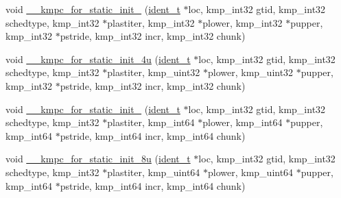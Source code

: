 \begin{DoxyCompactItemize}
\item 
void \hyperlink{group__WORK__SHARING_gab516cbd738ec072f4929faecbbc456f9}{\-\_\-\-\_\-kmpc\-\_\-for\-\_\-static\-\_\-init\-\_} (\hyperlink{group__BASIC__TYPES_ga690fda6b92f039a72db263c6b4394ddb}{ident\-\_\-t} $\ast$loc, kmp\-\_\-int32 gtid, kmp\-\_\-int32 schedtype, kmp\-\_\-int32 $\ast$plastiter, kmp\-\_\-int32 $\ast$plower, kmp\-\_\-int32 $\ast$pupper, kmp\-\_\-int32 $\ast$pstride, kmp\-\_\-int32 incr, kmp\-\_\-int32 chunk)
\item 
void \hyperlink{group__WORK__SHARING_ga305bbe90a798fdc8347aa809978365f5}{\-\_\-\-\_\-kmpc\-\_\-for\-\_\-static\-\_\-init\-\_\-4u} (\hyperlink{group__BASIC__TYPES_ga690fda6b92f039a72db263c6b4394ddb}{ident\-\_\-t} $\ast$loc, kmp\-\_\-int32 gtid, kmp\-\_\-int32 schedtype, kmp\-\_\-int32 $\ast$plastiter, kmp\-\_\-uint32 $\ast$plower, kmp\-\_\-uint32 $\ast$pupper, kmp\-\_\-int32 $\ast$pstride, kmp\-\_\-int32 incr, kmp\-\_\-int32 chunk)
\item 
void \hyperlink{group__WORK__SHARING_ga20f319fbf345661d19fc6bfd325231a5}{\-\_\-\-\_\-kmpc\-\_\-for\-\_\-static\-\_\-init\-\_} (\hyperlink{group__BASIC__TYPES_ga690fda6b92f039a72db263c6b4394ddb}{ident\-\_\-t} $\ast$loc, kmp\-\_\-int32 gtid, kmp\-\_\-int32 schedtype, kmp\-\_\-int32 $\ast$plastiter, kmp\-\_\-int64 $\ast$plower, kmp\-\_\-int64 $\ast$pupper, kmp\-\_\-int64 $\ast$pstride, kmp\-\_\-int64 incr, kmp\-\_\-int64 chunk)
\item 
void \hyperlink{group__WORK__SHARING_ga91d58a0a222e1f75e1d5d65b8ece3645}{\-\_\-\-\_\-kmpc\-\_\-for\-\_\-static\-\_\-init\-\_\-8u} (\hyperlink{group__BASIC__TYPES_ga690fda6b92f039a72db263c6b4394ddb}{ident\-\_\-t} $\ast$loc, kmp\-\_\-int32 gtid, kmp\-\_\-int32 schedtype, kmp\-\_\-int32 $\ast$plastiter, kmp\-\_\-uint64 $\ast$plower, kmp\-\_\-uint64 $\ast$pupper, kmp\-\_\-int64 $\ast$pstride, kmp\-\_\-int64 incr, kmp\-\_\-int64 chunk)
\end{DoxyCompactItemize}
